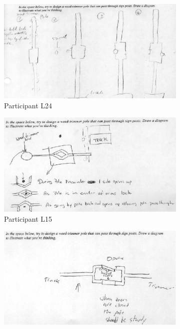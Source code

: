 \documentclass[12pt]{article}
\begin{document}
\begin{figure}[h!]
  \centering
    \begin{subfigure}[b]{0.8\linewidth}
    \includegraphics[width=\linewidth]{images/drawing_l24_con2.PNG}
    \caption{Participant L24}
  \end{subfigure}
  \begin{subfigure}[b]{0.3\linewidth}
    \includegraphics[width=\linewidth]{images/drawing_l15_con2.PNG}
     \caption{Participant L15}
  \end{subfigure}
  \begin{subfigure}[b]{0.3\linewidth}
    \includegraphics[width=\linewidth]{images/drawing_l16_con1.PNG}

\end{subfigure}
\end{figure}
\end{document}
